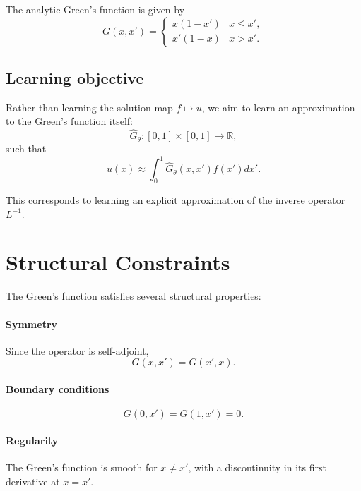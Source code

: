 \documentclass[11pt]{article}
\begin{document}
The analytic Green's function is given by
\begin{equation}
G(x,x') =
\begin{cases}
x(1-x') & x \le x', \\
x'(1-x) & x > x'.
\end{cases}
\end{equation}

\subsection{Learning objective}

Rather than learning the solution map $f \mapsto u$, we aim to learn an approximation
to the Green's function itself:
\begin{equation}
\hat{G}_\theta : [0,1] \times [0,1] \rightarrow \mathbb{R},
\end{equation}
such that
\begin{equation}
u(x) \approx \int_0^1 \hat{G}_\theta(x,x') f(x') dx'.
\end{equation}

This corresponds to learning an explicit approximation of the inverse operator
$L^{-1}$.

\section{Structural Constraints}

The Green's function satisfies several structural properties:

\paragraph{Symmetry}
Since the operator is self-adjoint,
\begin{equation}
G(x,x') = G(x',x).
\end{equation}

\paragraph{Boundary conditions}
\begin{equation}
G(0,x') = G(1,x') = 0.
\end{equation}

\paragraph{Regularity}
The Green's function is smooth for $x \neq x'$, with a discontinuity in its first
derivative at $x=x'$.
\end{document}
